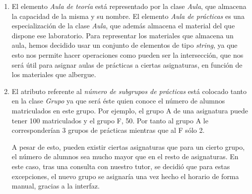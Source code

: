 \begin{enumerate}[$\bullet$]
    \item El elemento \textit{Aula de teoría} está representado por la clase \textit{Aula}, que almacena la capacidad de la misma y su nombre. El elemento \textit{Aula de prácticas} es una especialización de la clase \textit{Aula}, que además almacena el material del que dispone ese laboratorio. Para representar los materiales que almacena un aula, hemos decidido usar un conjunto de elementos de tipo \textit{string}, ya que esto nos permite hacer operaciones como pueden ser la intersección, que nos será útil para asignar aulas de prácticas a ciertas asignaturas, en función de los materiales que albergue.

     \item El atributo referente al \textit{número de subgrupos de prácticas} está colocado tanto en la clase \textit{Grupo} ya que será éste quien conoce el número de alumnos matriculados en este grupo. Por ejemplo, el grupo A de una asignatura puede tener 100 matriculados y el grupo F, 50. Por tanto al grupo A le corresponderían 3 grupos de prácticas mientras que al F sólo 2.

     A pesar de esto, pueden existir ciertas asignaturas que para un cierto grupo, el número de alumnos sea mucho mayor que en el resto de asignaturas. En este caso, tras una consulta con nuestro tutor, se decidió que para estas excepciones, el nuevo grupo se asignaría una vez hecho el horario de forma manual, gracias a la interfaz. 
\end{enumerate} 

